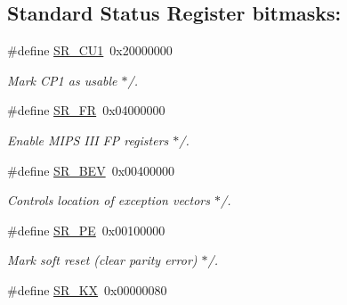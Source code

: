 \subsection*{Standard Status Register bitmasks\+:}
\begin{DoxyCompactItemize}
\item 
\mbox{\label{group__mips__regs_ga36fb41eeea92db5e2037314c739bd0ed}} 
\#define \mbox{\hyperlink{group__mips__regs_ga36fb41eeea92db5e2037314c739bd0ed}{S\+R\+\_\+\+C\+U1}}~0x20000000
\begin{DoxyCompactList}\small\item\em Mark C\+P1 as usable $\ast$/. \end{DoxyCompactList}\item 
\mbox{\label{group__mips__regs_ga9e84f30fe5d9fe25c894b030e6a2a9a5}} 
\#define \mbox{\hyperlink{group__mips__regs_ga9e84f30fe5d9fe25c894b030e6a2a9a5}{S\+R\+\_\+\+FR}}~0x04000000
\begin{DoxyCompactList}\small\item\em Enable M\+I\+PS I\+II FP registers $\ast$/. \end{DoxyCompactList}\item 
\mbox{\label{group__mips__regs_gad2a0c9b17ef7c84606a5156fbd8d22b3}} 
\#define \mbox{\hyperlink{group__mips__regs_gad2a0c9b17ef7c84606a5156fbd8d22b3}{S\+R\+\_\+\+B\+EV}}~0x00400000
\begin{DoxyCompactList}\small\item\em Controls location of exception vectors $\ast$/. \end{DoxyCompactList}\item 
\mbox{\label{group__mips__regs_gadd78363f69383b4c912141a5db2c1f44}} 
\#define \mbox{\hyperlink{group__mips__regs_gadd78363f69383b4c912141a5db2c1f44}{S\+R\+\_\+\+PE}}~0x00100000
\begin{DoxyCompactList}\small\item\em Mark soft reset (clear parity error) $\ast$/. \end{DoxyCompactList}\item 
\mbox{\label{group__mips__regs_ga1db5aeec66fb182178b2a461e7ab6b05}} 
\#define \mbox{\hyperlink{group__mips__regs_ga1db5aeec66fb182178b2a461e7ab6b05}{S\+R\+\_\+\+KX}}~0x00000080

\end{DoxyCompactItemize}
